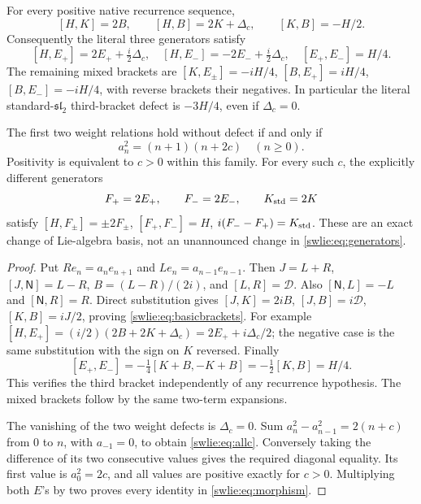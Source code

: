 \documentclass[11pt]{article}
\begin{document}
\begin{swlietheorem}\label{swlie:thm:brackets}
For every positive native recurrence sequence,
\begin{equation}\label{swlie:eq:basicbrackets}
 [H,K]=2B,\qquad [H,B]=2K+\Delta_c,\qquad [K,B]=-H/2.
\end{equation}
Consequently the literal three generators satisfy
\begin{equation}\label{swlie:eq:literalbrackets}
 \boxed{
 [H,E_+]=2E_++\tfrac i2\Delta_c,\quad
 [H,E_-]=-2E_-+\tfrac i2\Delta_c,\quad
 [E_+,E_-]=H/4.}
\end{equation}
The remaining mixed brackets are
$[K,E_\pm]=-iH/4$, $[B,E_+]=iH/4$,
$[B,E_-]=-iH/4$, with reverse brackets their negatives.
In particular the literal standard-$\mathfrak{sl}_2$
third-bracket defect is $-3H/4$, even if $\Delta_c=0$.

The first two weight relations hold without defect if and only if
\begin{equation}\label{swlie:eq:allc}
 a_n^2=(n+1)(n+2c)\quad(n\geq0).
\end{equation}
Positivity is equivalent to $c>0$ within this family.
For every such $c$, the explicitly different generators
\begin{equation}\label{swlie:eq:morphism}
 F_+=2E_+,\qquad F_-=2E_-,\qquad K_{\rm std}=2K
\end{equation}
satisfy
$[H,F_\pm]=\pm2F_\pm$, $[F_+,F_-]=H$,
$i(F_--F_+)=K_{\rm std}$.
These are an exact change of Lie-algebra basis, not an
unannounced change in \eqref{swlie:eq:generators}.
\end{swlietheorem}
\begin{proof}
Put $Re_n=a_ne_{n+1}$ and $Le_n=a_{n-1}e_{n-1}$.
Then $J=L+R$, $[J,\mathsf N]=L-R$,
$B=(L-R)/(2i)$, and $[L,R]=\mathcal D$.
Also $[\mathsf N,L]=-L$ and $[\mathsf N,R]=R$.
Direct substitution gives $[J,K]=2iB$,
$[J,B]=i\mathcal D$, $[K,B]=iJ/2$, proving
\eqref{swlie:eq:basicbrackets}. For example
$[H,E_+]=(i/2)(2B+2K+\Delta_c)
 =2E_++i\Delta_c/2$; the negative case is the same
substitution with the sign on $K$ reversed.
Finally
\[
 [E_+,E_-]=-\tfrac14[K+B,-K+B]
          =-\tfrac12[K,B]=H/4.
\]
This verifies the third bracket independently of any
recurrence hypothesis. The mixed brackets follow by the
same two-term expansions.

The vanishing of the two weight defects is $\Delta_c=0$.
Sum $a_n^2-a_{n-1}^2=2(n+c)$ from $0$ to $n$, with
$a_{-1}=0$, to obtain \eqref{swlie:eq:allc}. Conversely taking
the difference of its two consecutive values gives
the required diagonal equality. Its first value is
$a_0^2=2c$, and all values are positive exactly for $c>0$.
Multiplying both $E$'s by two proves every identity
in \eqref{swlie:eq:morphism}.
\end{proof}
\end{document}
